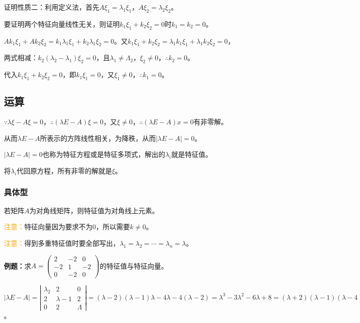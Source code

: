 \documentclass[UTF8, 12pt]{ctexart}
\begin{document}
证明性质二：利用定义法，首先$A\xi_1=\lambda_1\xi_1$，$A\xi_2=\lambda_2\xi_2$。

要证明两个特征向量线性无关，则证明$k_1\xi_1+k_2\xi_2=0$时$k_1=k_2=0$。

$Ak_1\xi_1+Ak_2\xi_2=k_1\lambda_1\xi_1+k_2\lambda_1\xi_2=0$。又$k_1\xi_1+k_2\xi_2=\lambda_1k_1\xi_1+\lambda_1k_2\xi_2=0$，

两式相减：$k_2(\lambda_2-\lambda_1)\xi_2=0$，且$\lambda_1\neq\Lambda_2$，$\xi_2\neq0$，$\therefore k_2=0$。

代入$k_1\xi_1+k_2\xi_2=0$，即$k_1\xi_1=0$，又$\xi_1\neq0$，$\therefore k_1=0$。

\subsection{运算}

$\because\lambda\xi-A\xi=0$，$\therefore(\lambda E-A)\xi=0$，又$\xi\neq0$，$\therefore(\lambda E-A)x=0$有非零解。

从而$\lambda E-A$所表示的方阵线性相关，为降秩，从而$\vert\lambda E-A\vert=0$。

$\vert\lambda E-A\vert=0$也称为特征方程或是特征多项式，解出的$\lambda_i$就是特征值。

将$\lambda_i$代回原方程，所有非零的解就是$\xi$。

\subsubsection{具体型}

若矩阵$A$为对角线矩阵，则特征值为对角线上元素。

\textcolor{orange}{注意：}特征向量因为要求不为0，所以需要$k\neq0$。

\textcolor{orange}{注意：}得到多重特征值时要全部写出，$\lambda_1=\lambda_2=\cdots=\lambda_n=\lambda$。

\textbf{例题：}求$A=\left(\begin{array}{ccc}
    2 & -2 & 0 \\
    -2 & 1 & -2 \\
    0 & -2 & 0
\end{array}\right)$的特征值与特征向量。

$\vert\lambda E-A\vert=\left|\begin{array}{ccc}
    \lambda_2 & 2 & 0 \\
    2 & \lambda-1 & 2 \\
    0 & 2 & \Lambda
\end{array}\right|=(\lambda-2)(\lambda-1)\lambda-4\lambda-4(\lambda-2)=\lambda^3-3\lambda^2-6\lambda+8=(\lambda+2)(\lambda-1)(\lambda-4)=0$。
\end{document}
